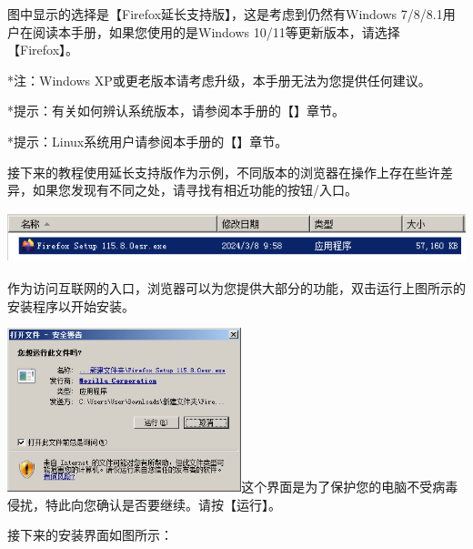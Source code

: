 图中显示的选择是【Firefox延长支持版】，这是考虑到仍然有Windows
7/8/8.1用户在阅读本手册，如果您使用的是Windows
10/11等更新版本，请选择【Firefox】。

*注：Windows XP或更老版本请考虑升级，本手册无法为您提供任何建议。

*提示：有关如何辨认系统版本，请参阅本手册的【】章节。

*提示：Linux系统用户请参阅本手册的【】章节。

接下来的教程使用延长支持版作为示例，不同版本的浏览器在操作上存在些许差异，如果您发现有不同之处，请寻找有相近功能的按钮/入口。

\includegraphics[width=5.76806in,height=0.58148in]{media/image3.png}

作为访问互联网的入口，浏览器可以为您提供大部分的功能，双击运行上图所示的安装程序以开始安装。

\includegraphics[width=2.68069in,height=1.87118in]{media/image4.png}这个界面是为了保护您的电脑不受病毒侵扰，特此向您确认是否要继续。请按【运行】。

接下来的安装界面如图所示：

